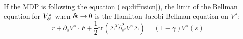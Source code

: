 If the MDP is following the equation (\ref{eq:diffusion}), rhe limit of the Bellman equation for $V^\pi_{\delta\hspace{-.1em}t}$ when ${\delta\hspace{-.1em}t} \rightarrow 0$ is the Hamilton-Jacobi-Bellman equation on $V^\pi$:
\begin{equation}
  \label{eq:hamilton-jacobi-bellman}
  r + \partial_s V^\pi \cdot F + \frac{1}{2} \text{tr}\left(\Sigma^T\partial^2_{s^2} V^\pi\Sigma\right) = (1 - \gamma) V^\pi(s)
\end{equation}




